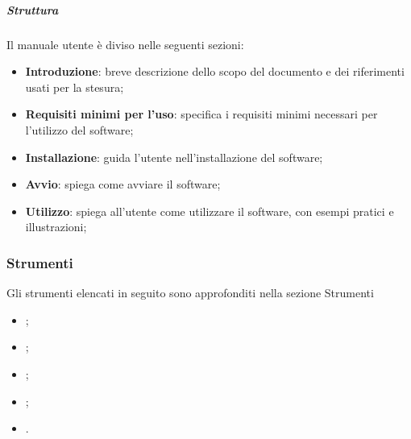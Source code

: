 \subparagraph{Struttura}
Il manuale utente è diviso nelle seguenti sezioni:
\begin{itemize}
    \item \textbf{Introduzione}: breve descrizione dello scopo del documento e dei riferimenti usati per la stesura;

    \item \textbf{Requisiti minimi per l'uso}: specifica i requisiti minimi necessari per l'utilizzo del software;

    \item \textbf{Installazione}: guida l'utente nell'installazione del software;

    \item \textbf{Avvio}: spiega come avviare il software;

    \item \textbf{Utilizzo}: spiega all'utente come utilizzare il software, con esempi pratici e illustrazioni;
\end{itemize}


\subsubsection{Strumenti}
Gli strumenti elencati in seguito sono approfonditi nella sezione Strumenti
\begin{itemize}
    \item {};
    \item {};
    \item {};
    \item {};
    \item {}.
\end{itemize}
